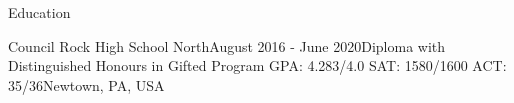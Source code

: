 \documentclass[UTF8]{resume} %
\begin{document}
\begin{rSection}{Education}
\begin{rSubsection}{Council Rock High School North}{August 2016 - June 2020}{Diploma with Distinguished Honours in Gifted Program GPA: 4.283/4.0  SAT: 1580/1600  ACT: 35/36}{Newtown, PA, USA}
    \end{rSubsection}
\end{rSection}
\end{document}
